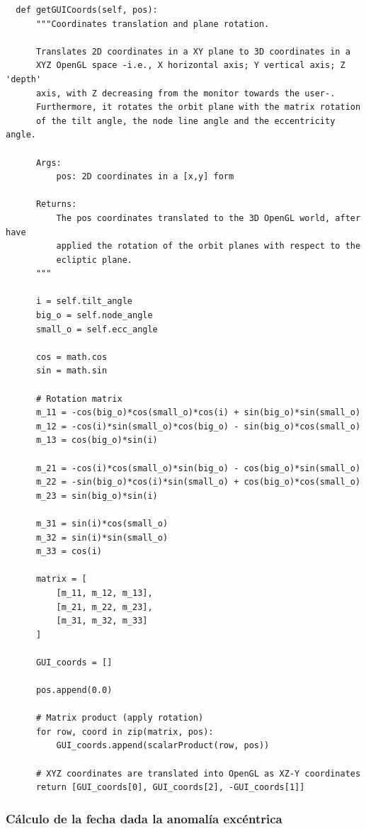 \documentclass[a4paper, 11pt]{article}
\begin{document}
  \begin{lstlisting}
  def getGUICoords(self, pos):
      """Coordinates translation and plane rotation.

      Translates 2D coordinates in a XY plane to 3D coordinates in a
      XYZ OpenGL space -i.e., X horizontal axis; Y vertical axis; Z 'depth'
      axis, with Z decreasing from the monitor towards the user-.
      Furthermore, it rotates the orbit plane with the matrix rotation
      of the tilt angle, the node line angle and the eccentricity angle.

      Args:
          pos: 2D coordinates in a [x,y] form

      Returns:
          The pos coordinates translated to the 3D OpenGL world, after have
          applied the rotation of the orbit planes with respect to the
          ecliptic plane.
      """

      i = self.tilt_angle
      big_o = self.node_angle
      small_o = self.ecc_angle

      cos = math.cos
      sin = math.sin

      # Rotation matrix
      m_11 = -cos(big_o)*cos(small_o)*cos(i) + sin(big_o)*sin(small_o)
      m_12 = -cos(i)*sin(small_o)*cos(big_o) - sin(big_o)*cos(small_o)
      m_13 = cos(big_o)*sin(i)

      m_21 = -cos(i)*cos(small_o)*sin(big_o) - cos(big_o)*sin(small_o)
      m_22 = -sin(big_o)*cos(i)*sin(small_o) + cos(big_o)*cos(small_o)
      m_23 = sin(big_o)*sin(i)

      m_31 = sin(i)*cos(small_o)
      m_32 = sin(i)*sin(small_o)
      m_33 = cos(i)

      matrix = [
          [m_11, m_12, m_13],
          [m_21, m_22, m_23],
          [m_31, m_32, m_33]
      ]

      GUI_coords = []

      pos.append(0.0)

      # Matrix product (apply rotation)
      for row, coord in zip(matrix, pos):
          GUI_coords.append(scalarProduct(row, pos))

      # XYZ coordinates are translated into OpenGL as XZ-Y coordinates
      return [GUI_coords[0], GUI_coords[2], -GUI_coords[1]]
  \end{lstlisting}

  \subsubsection{Cálculo de la fecha dada la anomalía excéntrica}
\end{document}
